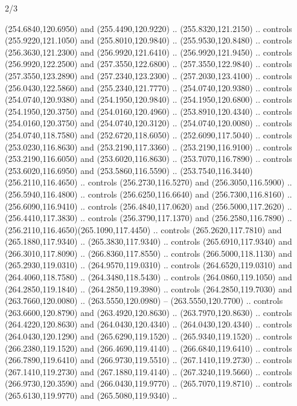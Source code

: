 \begin{flagdescription}{2/3}
\begin{scope}[xshift=0.5\flaglength,yshift=0.5\flagwidth,scale=\flagwidth/259.2]
\begin{scope}[y=0.8pt, x=0.8pt, yscale=-1,shift={(-243,-162)}]
      (254.6840,120.6950) and (255.4490,120.9220) .. (255.8320,121.2150) .. controls
      (255.9220,121.1050) and (255.8010,120.9840) .. (255.9530,120.8480) .. controls
      (256.3630,121.2300) and (256.9920,121.6410) .. (256.9920,121.9450) .. controls
      (256.9920,122.2500) and (257.3550,122.6800) .. (257.3550,122.9840) .. controls
      (257.3550,123.2890) and (257.2340,123.2300) .. (257.2030,123.4100) .. controls
      (256.0430,122.5860) and (255.2340,121.7770) .. (254.0740,120.9380) .. controls
      (254.0740,120.9380) and (254.1950,120.9840) .. (254.1950,120.6800) .. controls
      (254.1950,120.3750) and (254.0160,120.4960) .. (253.8910,120.4340) .. controls
      (254.0160,120.3750) and (254.0740,120.3120) .. (254.0740,120.0080) .. controls
      (254.0740,118.7580) and (252.6720,118.6050) .. (252.6090,117.5040) .. controls
      (253.0230,116.8630) and (253.2190,117.3360) .. (253.2190,116.9100) .. controls
      (253.2190,116.6050) and (253.6020,116.8630) .. (253.7070,116.7890) .. controls
      (253.6020,116.6950) and (253.5860,116.5590) ..
      (253.7540,116.3440)(256.2110,116.4650) .. controls (256.2730,116.5270) and
      (256.3050,116.5900) .. (256.5940,116.4800) .. controls (256.6250,116.6640) and
      (256.7300,116.8160) .. (256.6090,116.9410) .. controls (256.4840,117.0620) and
      (256.5000,117.2620) .. (256.4410,117.3830) .. controls (256.3790,117.1370) and
      (256.2580,116.7890) .. (256.2110,116.4650)(265.1090,117.4450) .. controls
      (265.2620,117.7810) and (265.1880,117.9340) .. (265.3830,117.9340) .. controls
      (265.6910,117.9340) and (266.3010,117.8090) .. (266.8360,117.8550) .. controls
      (266.5000,118.1130) and (265.2930,119.0310) .. (264.9570,119.0310) .. controls
      (264.6520,119.0310) and (264.4060,118.7580) .. (264.3480,118.5430) .. controls
      (264.0860,119.1050) and (264.2850,119.1840) .. (264.2850,119.3980) .. controls
      (264.2850,119.7030) and (263.7660,120.0080) .. (263.5550,120.0980) --
      (263.5550,120.7700) .. controls (263.6600,120.8790) and (263.4920,120.8630) ..
      (263.7970,120.8630) .. controls (264.4220,120.8630) and (264.0430,120.4340) ..
      (264.0430,120.4340) .. controls (264.0430,120.1290) and (265.6290,119.1520) ..
      (265.9340,119.1520) .. controls (266.2380,119.1520) and (266.4690,119.4140) ..
      (266.6840,119.6410) .. controls (266.7890,119.6410) and (266.9730,119.5510) ..
      (267.1410,119.2730) .. controls (267.1410,119.2730) and (267.1880,119.4140) ..
      (267.3240,119.5660) .. controls (266.9730,120.3590) and (266.0430,119.9770) ..
      (265.7070,119.8710) .. controls (265.6130,119.9770) and (265.5080,119.9340) ..

\end{scope}
\end{scope}
\end{flagdescription}
